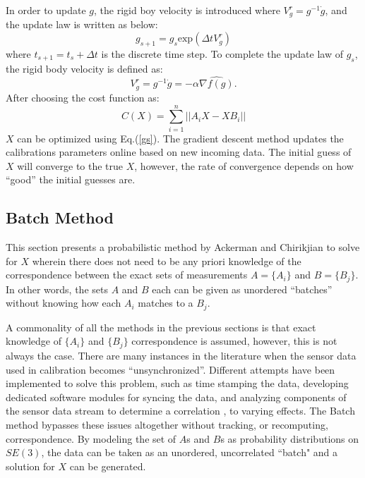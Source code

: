\documentclass[twocolumn,10pt]{asme2ej}
\begin{document}
In order to update $g$, the rigid boy velocity is introduced where $V^{r}_{g} = g^{-1}\dot{g}$, and the update law is written as below:
\begin{equation}
g_{s+1} = g_{s}\text{exp}(\Delta t V^{r}_{g})
\end{equation}
where $t_{s+1} = t_{s} + \Delta t$ is the discrete time step. To complete the update law of $g_s$, the rigid body velocity is defined as: 
\begin{equation}
V^{r}_{g} = g^{-1}\dot{g} = -\alpha \widehat{\nabla f(g)}.
\label{gs}
\end{equation} 
After choosing the cost function as:
\begin{equation}
C(X) = \sum_{i=1}^{n}||A_{i}X - XB_{i}||
\end{equation}
$X$ can be optimized using Eq.(\ref{gs}).
The gradient descent method updates the calibrations parameters online based on new incoming data. The initial guess of $X$ will converge to the true $X$, however, the rate of convergence depends on how ``good'' the initial guesses are.


\subsection{Batch Method}
\label{batchnoisefree}
This section presents a probabilistic method \cite{ackermanGSI} by Ackerman and Chirikjian to solve for $X$ wherein there does not need to be any priori knowledge of the correspondence between the exact sets of measurements
$A = \{A_i\}$ and $B = \{B_j\}$. In other words, the sets $A$ and $B$ each can be given as unordered ``batches'' without knowing how each $A_i$ matches to a $B_j$.

A commonality of all the methods in the previous sections is that exact knowledge of $\{A_i\}$ and $\{B_j\}$ correspondence is assumed, however, this is not always the case. There are many instances in the literature when the sensor data used in calibration becomes ``unsynchronized''. Different attempts have been implemented to solve this problem, such as time stamping the data, developing dedicated software modules for syncing the data, and analyzing components of the sensor data stream to determine a correlation \cite{darius1}, to varying effects. The Batch method bypasses these issues altogether without tracking, or recomputing, correspondence. By modeling the set of $A$s and $B$s as probability distributions on $SE(3)$, the data can be taken as an unordered, uncorrelated ``batch" and a solution for $X$ can be generated.
\end{document}
